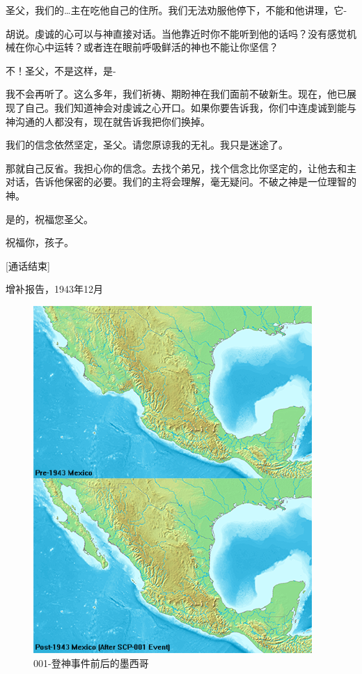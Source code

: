 \begin{scpbox}
圣父，我们的…主在吃他自己的住所。我们无法劝服他停下，不能和他讲理，它-

胡说。虔诚的心可以与神直接对话。当他靠近时你不能听到他的话吗？没有感觉机械在你心中运转？或者连在眼前呼吸鲜活的神也不能让你坚信？

不！圣父，不是这样，是-

我不会再听了。这么多年，我们祈祷、期盼神在我们面前不破新生。现在，他已展现了自己。我们知道神会对虔诚之心开口。如果你要告诉我，你们中连虔诚到能与神沟通的人都没有，现在就告诉我把你们换掉。

我们的信念依然坚定，圣父。请您原谅我的无礼。我只是迷途了。

那就自己反省。我担心你的信念。去找个弟兄，找个信念比你坚定的，让他去和主对话，告诉他保密的必要。我们的主将会理解，毫无疑问。不破之神是一位理智的神。

是的，祝福您圣父。

祝福你，孩子。

[通话结束]

\end{scpbox}

增补报告，1943年12月 \\

\begin{figure}[H]
	\centering
	\includegraphics[width=0.5\linewidth]{images/SCP-001-the-broken-god-5.png}
	\caption*{001-登神事件前后的墨西哥}
\end{figure}

